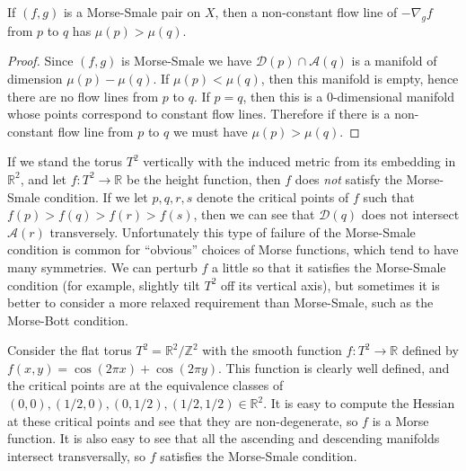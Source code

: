 \begin{lem}
If $(f,g)$ is a Morse-Smale pair on $X$, then a non-constant flow line of $-\nabla_g f$ from $p$ to $q$ has $\mu(p)>\mu(q)$.
\end{lem}
\begin{proof}
Since $(f,g)$ is Morse-Smale we have $\mathscr D(p) \cap \mathscr A(q)$ is a manifold of dimension $\mu(p)-\mu(q)$. If $\mu(p)<\mu(q)$, then this manifold is empty, hence there are no flow lines from $p$ to $q$. If $p=q$, then this is a 0-dimensional manifold whose points correspond to constant flow lines. Therefore if there is a non-constant flow line from $p$ to $q$ we must have $\mu(p)>\mu(q)$.
\end{proof}

\begin{example}
If we stand the torus $T^2$ vertically with the induced metric from its embedding in $\mathbb R^2$, and let $f : T^2 \rightarrow \mathbb R$ be the height function, then $f$ does \emph{not} satisfy the Morse-Smale condition. If we let $p,q,r,s$ denote the critical points of $f$ such that $f(p)>f(q)>f(r)>f(s)$, then we can see that $\mathscr D(q)$ does not intersect $\mathscr A(r)$ transversely. Unfortunately this type of failure of the Morse-Smale condition is common for ``obvious'' choices of Morse functions, which tend to have many symmetries. We can perturb $f$ a little so that it satisfies the Morse-Smale condition (for example, slightly tilt $T^2$ off its vertical axis), but sometimes it is better to consider a more relaxed requirement than Morse-Smale, such as the Morse-Bott condition.
\end{example}

\begin{example}
Consider the flat torus $T^2 = \mathbb R^2 / \mathbb Z^2$ with the smooth function $f : T^2 \rightarrow \mathbb R$ defined by $f(x,y) = \cos(2\pi x) + \cos (2\pi y)$. This function is clearly well defined, and the critical points are at the equivalence classes of $(0,0), (1/2,0), (0,1/2), (1/2,1/2) \in \mathbb R^2$. It is easy to compute the Hessian at these critical points and see that they are non-degenerate, so $f$ is a Morse function. It is also easy to see that all the ascending and descending manifolds intersect transversally, so $f$ satisfies the Morse-Smale condition.
\end{example}

